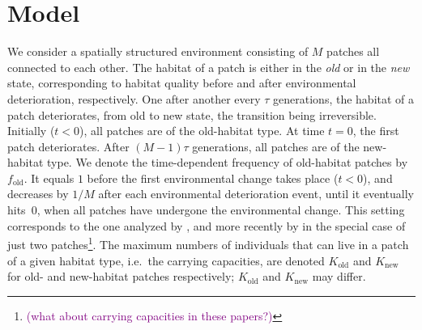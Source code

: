 \documentclass[a4paper,11pt]{article}
\newcommand{\florence}[1]{\textcolor{purple}{(#1)}} %
\newcommand{\chg}[1]{\textcolor{change}{#1}}
\begin{document}
\section*{Model}
We consider a spatially structured environment consisting of $M$ patches all connected to each other. The habitat of a patch is either in the \textit{old} or in the \textit{new} state, corresponding to habitat quality before and after environmental deterioration, respectively. One after \chg{another} every $\tau$ generations, the habitat of a patch deteriorates, from old to new state, the transition being irreversible. Initially ($t<0$), all patches are of the old-habitat type. At time $t=0$, the first patch deteriorates. After $(M-1)\tau$ generations, all patches are of the new-habitat type. We denote the time-dependent frequency of old-habitat patches by $f_{\text{old}}$. It equals $1$ before the first environmental change takes place ($t<0$), and decreases by $1/M$ after each environmental deterioration event, until it eventually hits~$0$, when all patches have undergone the environmental change. This setting corresponds to the one analyzed by \citet{uecker_2014}, and more recently by \citet{tomasini_2019} in the special case of just two patches\footnote{\florence{what about carrying capacities in these papers?}}. The maximum numbers of individuals that can live in a patch of a given habitat type, i.e.\ the carrying capacities, are denoted $K_{\text{old}}$ and $K_{\text{new}}$ for old- and new-habitat patches respectively; $K_{\text{old}}$ and $K_{\text{new}}$ may differ.
\end{document}
